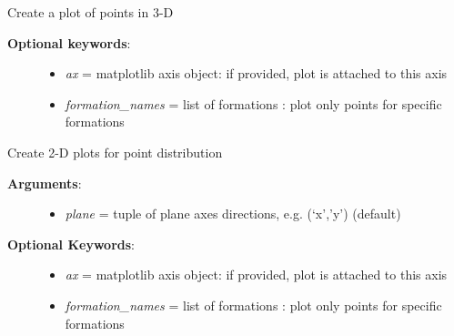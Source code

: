\documentclass[letterpaper,10pt,english]{sphinxmanual}
\begin{document}
\begin{fulllineitems}
\begin{fulllineitems}
\label{pygeomod:pygeomod.struct_data.Struct3DPoints.plot_3D}
Create a plot of points in 3-D
\begin{description}
\item[{\textbf{Optional keywords}:}] \leavevmode\begin{itemize}
\item {} 
\emph{ax} = matplotlib axis object: if provided, plot is attached to this axis

\item {} 
\emph{formation\_names} = list of formations : plot only points for specific formations

\end{itemize}

\end{description}

\end{fulllineitems}


\begin{fulllineitems}
\label{pygeomod:pygeomod.struct_data.Struct3DPoints.plot_plane}
Create 2-D plots for point distribution
\begin{description}
\item[{\textbf{Arguments}:}] \leavevmode\begin{itemize}
\item {} 
\emph{plane} = tuple of plane axes directions, e.g. (`x','y') (default)

\end{itemize}

\item[{\textbf{Optional Keywords}:}] \leavevmode\begin{itemize}
\item {} 
\emph{ax} = matplotlib axis object: if provided, plot is attached to this axis

\item {} 
\emph{formation\_names} = list of formations : plot only points for specific formations

\end{itemize}

\end{description}

\end{fulllineitems}


\end{fulllineitems}
\end{document}
